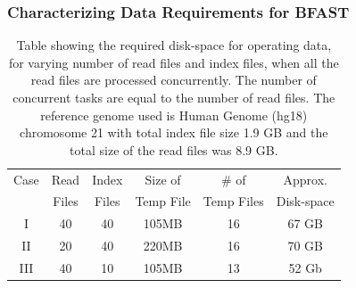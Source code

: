 \documentclass{cpeauth}
\begin{document}


 
\subsubsection{Characterizing Data Requirements for BFAST}




\begin{table}
 \begin{tabular}{|c|c|c|c|c|c|} 
 \hline 
Case &Read& Index& Size of&  \# of & Approx.  \\
 &Files &  Files  & Temp File & Temp Files & Disk-space\\
 \hline
I&40 & 40 &105MB & 16 &67 GB \\
II&20 & 40 & 220MB & 16 &70 GB \\
III&40 & 10 & 105MB & 13 &52 Gb \\ 
 \hline
 \end{tabular}

 \caption{Table showing the required disk-space for operating data,
   for varying number of read files and index files, when all the read
   files are processed concurrently.  The number of concurrent tasks are
   equal to the number of read files. The reference genome used is Human
   Genome (hg18) chromosome 21 with total index file size 1.9 GB and
   the total size of the read files was 8.9 GB.}
    \label{table:dynamic-diskspace} 
\end{table}
\end{document}
